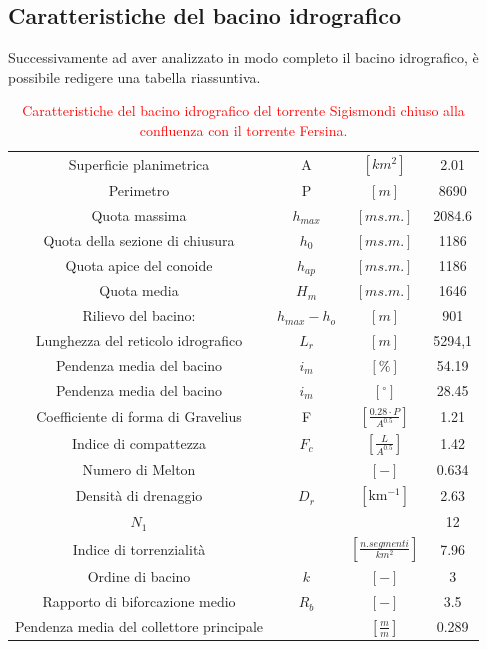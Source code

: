 \subsection{Caratteristiche del bacino idrografico}
Successivamente ad aver analizzato in modo completo il bacino idrografico, è possibile redigere una tabella riassuntiva.
\begin{table}[H] \centering
    \caption{\textcolor{red}{Caratteristiche del bacino idrografico  del torrente Sigismondi chiuso alla confluenza con il torrente Fersina.}}
    \label{tab:caratteristiche_bacino}
    \begin{tabular}{ cccc } 
    \toprule
    Superficie planimetrica & A &  $\left[km^2\right]$ & 2.01 \\ 
    Perimetro & P & $\left[m\right]$        &      8690       \\ 
    Quota massima & $h_{max}$&  $\left[m s.m.\right]$       &    2084.6     \\
    Quota della sezione di chiusura & $h_0$ & $\left[m s.m.\right]$        &       1186      \\ 
    Quota apice del conoide &$h_{ap}$& $\left[m s.m.\right]$ & 1186\\ 
    Quota media& $H_m$ & $\left[m s.m.\right]$ & 1646    \\ 
    Rilievo del bacino:& $h_{max} - h_o$ & $\left[m\right]$ &   901 \\ 
    Lunghezza del reticolo idrografico& $L_r$& $\left[m\right]$ & 5294,1 \\ 
    Pendenza media del bacino& $i_m$ & $\left[\%\right]$ & 54.19    \\ 
    Pendenza media del bacino& $i_m$& $\left[ ^\circ \right]$ & 28.45   \\ 
    Coefficiente di forma di Gravelius& F& $\left[\frac{0.28 \cdot P}{A^{0.5}} \right]$ & 1.21\\  
    Indice di compattezza &$F_c$  & $ \left[\frac{L}{A^{0.5}}\right]$ & 1.42\\ 
    Numero di Melton& & $\left[-\right]$ & 0.634\\ 
    Densità di drenaggio &$D_r$& $\left[\si{\km^{-1}}\right]$& 2.63 \\ 
    $N_1$& & & 12 \\ 
    Indice di torrenzialità& &$\left[\frac{n. segmenti }{km^2}\right]$ & 7.96 \\  
    Ordine di bacino& $k$ & $\left[-\right]$ & 3 \\ 
    Rapporto di biforcazione medio& $R_b$ & $\left[-\right]$ &  3.5 \\  
    Pendenza media del collettore principale & & $\left[\frac{m}{m}\right]$ & 0.289\\  
    \bottomrule
\end{tabular}
\end{table}